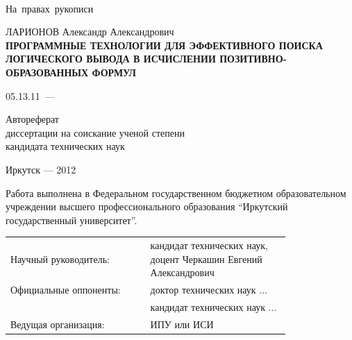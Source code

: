 \documentclass[a4paper]{report}
\begin{document}
\begin{titlepage}
\mbox{~}\\{}
\vfill{}
\hfill{\vbox{\hbox{На правах рукописи}}}
\vspace{1cm}\vfill
\begin{center}
    ЛАРИОНОВ Александр Александрович \\
    \vspace{0.5cm}
\bf ПРОГРАММНЫЕ ТЕХНОЛОГИИ ДЛЯ ЭФФЕКТИВНОГО ПОИСКА ЛОГИЧЕСКОГО ВЫВОДА В ИСЧИСЛЕНИИ ПОЗИТИВНО-ОБРАЗОВАННЫХ ФОРМУЛ
\end{center}
\vfill
\hfil\hbox{\hbox{05.13.11 --- }
    \hbox{}%
}\hfil
\vspace{1cm}
\begin{center}
    Автореферат \\
    диссертации на соискание ученой степени \\
    кандидата технических наук
\end{center}
\vfill
\vfill
\begin{center}
{Иркутск --- 2012}
\end{center}
\end{titlepage}

%
\def\namepc{\hbox{$\rm\mu{}$PrISM}}

\newpage
\setcounter{page}{2}
Работа выполнена в Федеральном государственном бюджетном образовательном учреждении высшего профессионального образования ``Иркутский государственный университет''.


\begin{longtable}[H]{p{0.4\linewidth}p{0.4\linewidth}}
Научный руководитель: & кандидат технических наук, доцент Черкашин Евгений Александрович \\
Официальные  оппоненты: & доктор технических наук ... \\
{}~{}  & кандидат технических наук ... \\
Ведущая организация: & ИПУ или ИСИ \\
\end{longtable}
\end{document}
